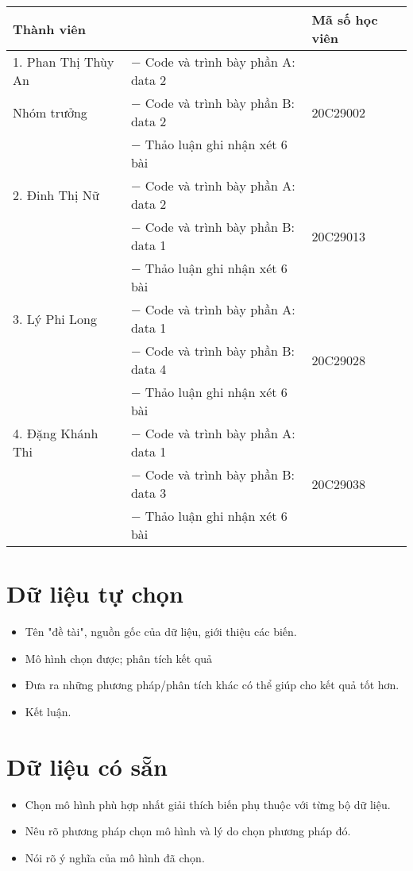 \documentclass[a4paper]{book}
\begin{document}
\begin{table}[H]
	\centering
	\begin{tabular}{|m{4.5cm}||m{8cm}|m{3.5cm}|} 
		\hline
		\textbf{Thành viên} & \centering{\textbf{Công việc}} & \textbf{Mã số học viên}\\
		\hline
		1. Phan Thị Thùy An & $-$ Code và trình bày phần A: data 2 & \\
		Nhóm trưởng & $-$ Code và trình bày phần B: data 2 & 20C29002 \\
		& $-$ Thảo luận ghi nhận xét 6 bài & \\
		\hline
		2. Đinh Thị Nữ  & $-$ Code và trình bày phần A: data 2 & \\
		& $-$ Code và trình bày phần B: data 1& 20C29013\\
		& $-$ Thảo luận ghi nhận xét 6 bài & \\
		\hline
		3. Lý Phi Long & $-$ Code và trình bày phần A: data 1 & \\
		& $-$ Code và trình bày phần B: data 4& 20C29028\\
		& $-$ Thảo luận ghi nhận xét 6 bài & \\
		\hline
		4. Đặng Khánh Thi & $-$ Code và trình bày phần A: data 1 & \\
		& $-$ Code và trình bày phần B: data 3& 20C29038 \\
		& $-$ Thảo luận ghi nhận xét 6 bài & \\
		\hline
	\end{tabular}
\end{table}

\chapter{Dữ liệu tự chọn}
\begin{itemize}
	\item Tên "đề tài", nguồn gốc của dữ liệu, giới thiệu các biến.
	\item Mô hình chọn được; phân tích kết quả
	\item Đưa ra những phương pháp/phân tích khác có thể giúp cho kết quả tốt hơn.
	\item Kết luận.
\end{itemize}




\chapter{Dữ liệu có sẵn}
\begin{itemize}
	\item Chọn mô hình phù hợp nhất giải thích biến phụ thuộc với từng bộ dữ liệu.
	\item Nêu rõ phương pháp chọn mô hình và lý do chọn phương pháp đó.
	\item Nói rõ ý nghĩa của mô hình đã chọn.
\end{itemize}





\end{document}
